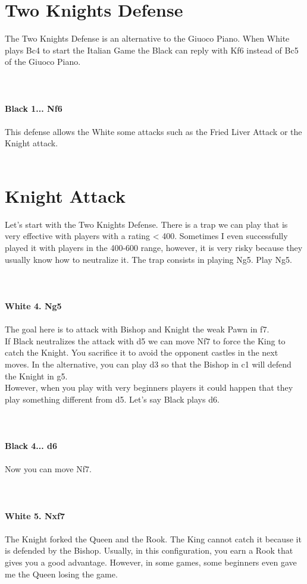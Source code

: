 \documentclass{article}
\begin{document}
\section{ Two Knights Defense}

The Two Knights Defense is an alternative to the Giuoco Piano. When White plays Bc4 to start the Italian Game the Black can reply with Kf6 instead of Bc5 of the Giuoco Piano.\\
\\

\\
\\
\textbf{Black 1... Nf6}\\
\\
This defense allows the White some attacks such as the Fried Liver Attack or the Knight attack.\\
\\
\section{ Knight Attack}

Let's start with the Two Knights Defense. There is a trap we can play that is very effective with players with a rating < 400. Sometimes I even successfully played it with players in the 400-600 range, however, it is very risky because they usually know how to neutralize it. The trap consists in playing Ng5. Play Ng5.\\
\\

\\
\\
\textbf{White 4. Ng5}\\
\\
The goal here is to attack with Bishop and Knight the weak Pawn in f7.\\If Black neutralizes the attack with d5 we can move Nf7 to force the King to catch the Knight. You sacrifice it to avoid the opponent castles in the next moves. In the alternative, you can play d3 so that the Bishop in c1 will defend the Knight in g5.\\However, when you play with very beginners players it could happen that they play something different from d5. Let's say Black plays d6.\\
\\

\\
\\
\textbf{Black 4... d6}\\
\\
Now you can move Nf7.\\
\\

\\
\\
\textbf{White 5. Nxf7}\\
\\
The Knight forked the Queen and the Rook. The King cannot catch it because it is defended by the Bishop. Usually, in this configuration, you earn a Rook that gives you a good advantage. However, in some games, some beginners even gave me the Queen losing the game.\\
\\
\end{document}
